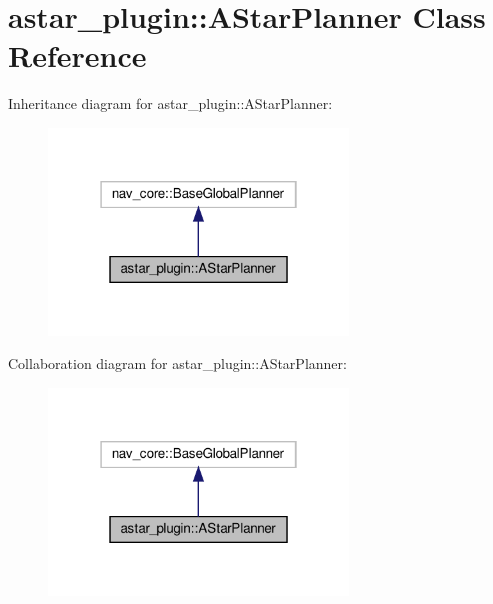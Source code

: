 \hypertarget{classastar__plugin_1_1_a_star_planner}{}\section{astar\+\_\+plugin\+:\+:A\+Star\+Planner Class Reference}
\label{classastar__plugin_1_1_a_star_planner}


Inheritance diagram for astar\+\_\+plugin\+:\+:A\+Star\+Planner\+:
\nopagebreak
\begin{figure}[H]
\begin{center}
\leavevmode
\includegraphics[width=226pt]{classastar__plugin_1_1_a_star_planner__inherit__graph}
\end{center}
\end{figure}


Collaboration diagram for astar\+\_\+plugin\+:\+:A\+Star\+Planner\+:
\nopagebreak
\begin{figure}[H]
\begin{center}
\leavevmode
\includegraphics[width=226pt]{classastar__plugin_1_1_a_star_planner__coll__graph}
\end{center}
\end{figure}
